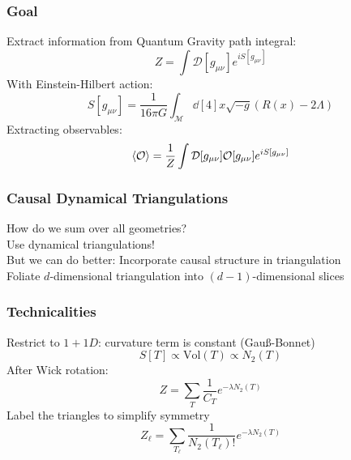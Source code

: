 \begin{frame}
    \frametitle{Goal}
    Extract information from Quantum Gravity path integral:
    \begin{equation}
        Z = \int \mathcal{D}[g_{\mu \nu}] e^{i S[g_{\mu \nu}]}
    \end{equation}
    With Einstein-Hilbert action:
    \begin{equation}
        S[g_{\mu \nu}]
        =
        \frac{1}{16 \pi G}
        \int_\mathcal{M} \dd[4]{x} \sqrt{-g}
        (R(x) - 2 \Lambda)
    \end{equation}
    Extracting observables:
    \begin{equation}
        \ev{\mathcal{O}}
        =
        \frac{1}{Z} \int \mathcal{D}[g_{\mu \nu}]
        \mathcal{O}[g_{\mu \nu}]
        e^{i S[g_{\mu \nu}]}
    \end{equation}
\end{frame}

\begin{frame}
    \frametitle{Causal Dynamical Triangulations}
    How do we sum over all geometries? \\
    Use dynamical triangulations! \\
    But we can do better: Incorporate causal structure in triangulation \\
    Foliate $d$-dimensional triangulation into $(d - 1)$-dimensional slices \\
\end{frame}

\begin{frame}
    \frametitle{Technicalities}
    Restrict to $1 + 1D$: curvature term is constant (Gau\ss -Bonnet) \\
    \begin{equation}
        S[T] \propto \text{Vol}(T) \propto N_2(T)
    \end{equation}
    After Wick rotation:
    \begin{equation}
        Z = \sum_{T} \frac{1}{C_T} e^{-\lambda N_2(T)}
    \end{equation}
    Label the triangles to simplify symmetry
    \begin{equation}
        Z_\ell = \sum _{T_\ell} \frac{1}{N_2(T_\ell)!} e^{-\lambda N_2(T)}
    \end{equation}
\end{frame}